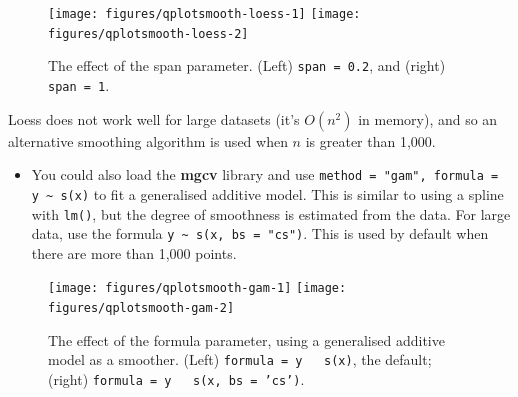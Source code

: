 \begin{figure}
\texttt{[image: figures/qplotsmooth-loess-1]} \texttt{[image: figures/qplotsmooth-loess-2]} \caption{The effect of the span parameter.  (Left) \texttt{span = 0.2}, and (right) \texttt{span = 1}.\label{fig:smooth-loess}}
\end{figure}

\noindent Loess does not work well for large datasets (it's $O(n^2)$ in
memory), and so an alternative smoothing algorithm is used when $n$ is
greater than 1,000.

\begin{itemize}
\itemsep1pt\parskip0pt
\item
  You could also load the \textbf{mgcv} library and use
  \texttt{method = "gam", formula = y \textasciitilde{} s(x)} to fit a
  generalised additive model. This is similar to using a spline with
  \texttt{lm()}, but the degree of smoothness is estimated from the
  data. For large data, use the formula
  \texttt{y \textasciitilde{} s(x, bs = "cs")}. This is used by default
  when there are more than 1,000 points. 
\end{itemize}

\begin{Shaded}
\begin{Highlighting}[]
  \NormalTok{(}\NormalTok{, }\NormalTok{), }
   \NormalTok{, } \StringTok{ }
  \NormalTok{(}\NormalTok{, }\NormalTok{), }
   \NormalTok{, } \StringTok{ } \NormalTok{))}
\end{Highlighting}
\end{Shaded}

\begin{figure}
\texttt{[image: figures/qplotsmooth-gam-1]} \texttt{[image: figures/qplotsmooth-gam-2]} \caption{The effect of the formula parameter, using a generalised additive model as a smoother.  (Left) \texttt{formula = y ~ s(x)}, the default; (right) \texttt{formula = y ~ s(x, bs = 'cs')}.\label{fig:smooth-gam}}
\end{figure}

